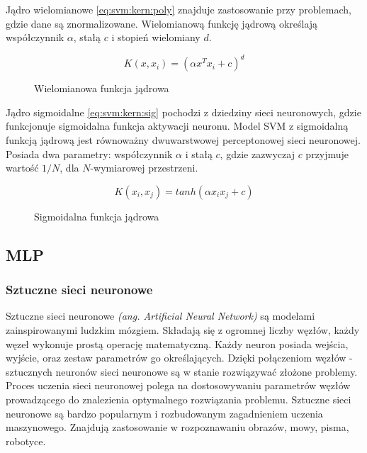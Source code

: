 \documentclass[a4paper,12pt,twoside,openany]{report}
\newcommand{\ang}[1]{\textit{(ang. #1)}}
\begin{document}
\begin{enumerate}
Jądro wielomianowe \ref{eq:svm:kern:poly} znajduje zastosowanie przy problemach,
gdzie dane są znormalizowane. 
Wielomianową funkcję jądrową określają współczynnik $\alpha$, stałą $c$ i stopień wielomiany $d$.
\begin{figure}[hc]
	\begin{equation}
		\label{eq:svm:kern:poly}
		K(x, x_i) = (\alpha x^T x_i + c)^d 
	\end{equation}
	\caption{Wielomianowa funkcja jądrowa}
\end{figure}

Jądro sigmoidalne \ref{eq:svm:kern:sig} pochodzi z dziedziny sieci neuronowych,
gdzie funkcjonuje sigmoidalna funkcja aktywacji neuronu. 
Model SVM z sigmoidalną funkcją jądrową jest równoważny dwuwarstwowej perceptonowej sieci neuronowej.
Posiada dwa parametry: współczynnik $\alpha$ i stałą $c$, gdzie zazwyczaj $c$ przyjmuje wartość $1/N$,
dla $N$-wymiarowej przestrzeni.
\begin{figure}[hc]
	\begin{equation}
		\label{eq:svm:kern:sig}
		K(x_i, x_j) = tanh( \alpha x_i  x_j + c)
	\end{equation}
	\caption{Sigmoidalna funkcja jądrowa}
\end{figure}
\subsection{MLP}
\subsubsection{Sztuczne sieci neuronowe}
Sztuczne sieci neuronowe \ang{Artificial Neural Network} są modelami zainspirowanymi ludzkim mózgiem.
Składają się z ogromnej liczby węzłów, każdy węzeł wykonuje prostą operację matematyczną.
Każdy neuron posiada wejścia, wyjście, oraz zestaw parametrów go określających. 
Dzięki połączeniom węzłów - sztucznych neuronów sieci neuronowe są w stanie rozwiązywać złożone problemy.
Proces uczenia sieci neuronowej polega na dostosowywaniu parametrów węzłów prowadzącego do znalezienia optymalnego rozwiązania problemu.
Sztuczne sieci neuronowe są bardzo popularnym i rozbudowanym zagadnieniem uczenia maszynowego.
Znajdują zastosowanie w rozpoznawaniu obrazów, mowy, pisma, robotyce. 


\end{enumerate}
\end{document}

